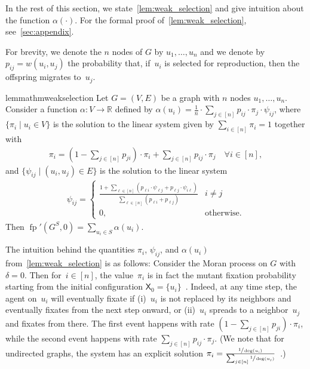 \documentclass[letterpaper]{article}
\def\R{\mathbb{R}}
\newcommand{\X}{\mathsf{X}}
\newcommand{\fp}{\operatorname{fp}}
\newcommand{\FitAdv}{\delta}
\newcommand{\Weight}{w}
\begin{document}
In the rest of this section, we state~\cref{lem:weak_selection}
and give intuition about the function $\alpha(\cdot)$.
For the formal proof of~\cref{lem:weak_selection}, see~\cref{sec:appendix}. %

For brevity, we denote the $n$ nodes of $G$ by $u_1,\dots,u_n$
and we denote by~$p_{ij}=\Weight(u_i, u_j)$ the probability that,
if~$u_i$ is selected for reproduction, then the offspring migrates to~$u_j$.

\begin{restatable}{lemma}{thmweakselection}\label{lem:weak_selection}
Let $G=(V,E)$ be a graph with $n$ nodes $u_1,\dots,u_n$. %
 Consider a function $\alpha\colon V\to\R$ defined by $\alpha(u_i) =  \frac{1}{n}\cdot \sum_{j\in[n]} p_{ij} \cdot \pi_j\cdot \psi_{ij}$,
where $\{\pi_i\mid u_i\in V\}$ is the solution to the linear system
given by $\sum_{i\in [n]} \pi_i=1$ together with
\begin{align}
\pi_i= \left(1-\sum_{j\in[n]} p_{ji}\right)\cdot \pi_i +\sum_{j\in[n]} p_{ij}\cdot \pi_j\quad\forall i\in[n],
\label{eq:pi2}
\end{align}
and $\{\psi_{ij} \mid (u_i,u_j)\in E\}$ is the solution to the linear system
\begin{align}
\psi_{ij}=
\begin{cases}
\frac{1+\sum_{\ell\in[n]}\left(p_{\ell i}\cdot \psi_{\ell j} + p_{\ell j}\cdot \psi_{i\ell}\right)}{\sum_{\ell\in[n]}\left(p_{\ell i}+p_{\ell j}\right)} & i\neq j %
\\
0, & \text{otherwise}.
\end{cases}
\label{eq:psi}
\end{align}
Then $\fp'(G^S,0)=\sum_{u_i\in S} \alpha(u_i)$.
\end{restatable}

The intuition behind the quantities $\pi_i$, $\psi_{ij}$, and $\alpha(u_i)$ from~\cref{lem:weak_selection} is as follows:
Consider the Moran process on $G$ with $\FitAdv=0$.
Then for~$i\in[n]$, the value~$\pi_i$ is in fact the mutant fixation probability
starting from the initial configuration $\X_0=\{u_i\}$~\cite{Allen2021}.
Indeed, at any time step, the agent on~$u_i$ will eventually fixate if
(i)~$u_i$ is not replaced by its neighbors and eventually fixates from the next step onward, or
(ii)~$u_i$ spreads to a neighbor~$u_j$ and fixates from there.
The first event happens with rate $(1-\sum_{j\in[n]}p_{ji})\cdot\pi_i $,
while the second event happens with rate $\sum_{j\in[n]} p_{ij}\cdot \pi_j$.
(We note that for undirected graphs, the system has an explicit solution
$\pi_i = \frac{\sfrac{1}{\deg(u_i)}}{\sum_{j\in[n]}\sfrac{1}{\deg(u_j)}}$~\cite{Broom2010}.)
\end{document}
